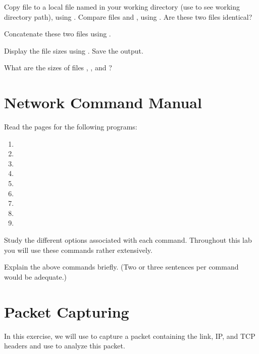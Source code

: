 \documentclass{../UTNetLab}
\begin{document}
    Copy  file to a local file named  in your working directory (use  to see working directory path),
    using .
    Compare files  and , using .
    Are these two files identical?

    Concatenate these two files using .

    Display the file sizes using .
    Save the output.
    
    \begin{report}
        \item What are the sizes of files , , and ?
    \end{report}

\section{Network Command Manual}
    Read the  pages for the following programs:
    \begin{multicols}{3}
        \begin{enumerate}
            \item {}
            \item {}
            \item {}
            \item {}
            \item {}
            \item {}
            \item {}
            \item {}
            \item {}
        \end{enumerate}
    \end{multicols}
    Study the different options associated with each command.
    Throughout this lab you will use these commands rather extensively.
    
    \begin{report}
        \item Explain the above commands briefly.
            (Two or three sentences per command would be adequate.)
    \end{report}

\section{Packet Capturing}
    In this exercise, we will use  to capture a packet containing the link, IP, and TCP headers and use  to analyze this packet.
\end{document}
